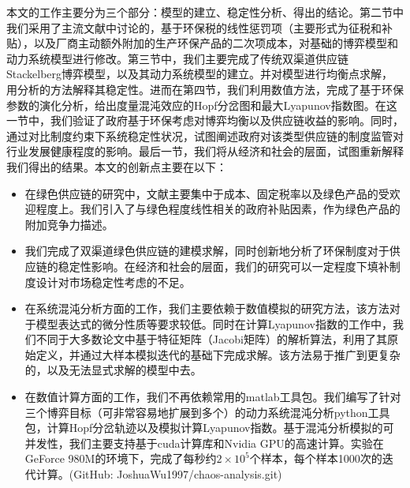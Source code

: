 \documentclass{article}
\begin{document}
\par 本文的工作主要分为三个部分：模型的建立、稳定性分析、得出的结论。第二节中我们采用了主流文献中讨论的，基于环保税的线性惩罚项（主要形式为征税和补贴），以及厂商主动额外附加的生产环保产品的二次项成本，对基础的博弈模型和动力系统模型进行修改。第三节中，我们主要完成了传统双渠道供应链Stackelberg博弈模型，以及其动力系统模型的建立。并对模型进行均衡点求解，用分析的方法解释其稳定性。进而在第四节，我们利用数值方法，完成了基于环保参数的演化分析，给出度量混沌效应的Hopf分岔图和最大Lyapunov指数图。在这一节中，我们验证了政府基于环保考虑对博弈均衡以及供应链收益的影响。同时，通过对比制度约束下系统稳定性状况，试图阐述政府对该类型供应链的制度监管对行业发展健康程度的影响。最后一节，我们将从经济和社会的层面，试图重新解释我们得出的结果。本文的创新点主要在以下：%
\begin{itemize}
    \item 在绿色供应链的研究中，文献主要集中于成本、固定税率以及绿色产品的受欢迎程度上。我们引入了与绿色程度线性相关的政府补贴因素，作为绿色产品的附加竞争力描述。
    \item 我们完成了双渠道绿色供应链的建模求解，同时创新地分析了环保制度对于供应链的稳定性影响。在经济和社会的层面，我们的研究可以一定程度下填补制度设计对市场稳定性考虑的不足。
    \item 在系统混沌分析方面的工作，我们主要依赖于数值模拟的研究方法，该方法对于模型表达式的微分性质等要求较低。同时在计算Lyapunov指数的工作中，我们不同于大多数论文中基于特征矩阵（Jacobi矩阵）的解析算法，利用了其原始定义，并通过大样本模拟迭代的基础下完成求解。该方法易于推广到更复杂的，以及无法显式求解的模型中去。
    \item 在数值计算方面的工作，我们不再依赖常用的matlab工具包。我们编写了针对三个博弈目标（可非常容易地扩展到多个）的动力系统混沌分析python工具包，计算Hopf分岔轨迹以及模拟计算Lyapunov指数。基于混沌分析模拟的可并发性，我们主要支持基于cuda计算库和Nvidia GPU的高速计算。实验在GeForce 980M的环境下，完成了每秒约$2\times10^5$个样本，每个样本1000次的迭代计算。(GitHub: JoshuaWu1997/chaos-analysis.git)
\end{itemize}
\end{document}
